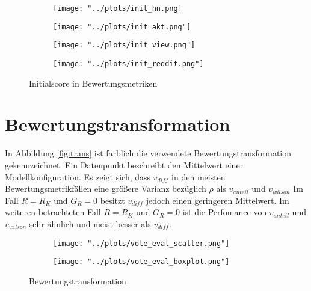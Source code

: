 \begin{figure}[!htb]
	\begin{subfigure}{0.5\textwidth}
		\texttt{[image: "../plots/init\_hn.png]}%
	\end{subfigure}
	\hfill
	\begin{subfigure}{0.5\textwidth}
		
		
		\texttt{[image: "../plots/init\_akt.png"]}%

	\end{subfigure}
	\begin{subfigure}{0.5\textwidth}
		\texttt{[image: "../plots/init\_view.png"]}%
	\end{subfigure}
	\hfill
	\begin{subfigure}{0.5\textwidth}
		\texttt{[image: "../plots/init\_reddit.png"]}%
	\end{subfigure}
	\caption{Initialscore in Bewertungsmetriken}
	\label{fig:init_scoring_functions}
\end{figure}



\section{Bewertungstransformation}

In Abbildung \ref{fig:trans} ist farblich die verwendete Bewertungstransformation gekennzeichnet. Ein Datenpunkt beschreibt den Mittelwert einer Modellkonfiguration. Es zeigt sich, dass $v_{diff}$ in den meisten Bewertungsmetrikfällen eine größere Varianz bezüglich $\rho$ als $v_{anteil}$ und $v_{wilson}$ Im Fall $R = R_K$ und $G_R = 0$ besitzt $v_{diff}$ jedoch einen geringeren Mittelwert. Im weiteren betrachteten Fall $R = R_K$ und $G_R = 0$ ist die Perfomance von $v_{anteil}$ und $v_{wilson}$ sehr ähnlich und meist besser als $v_{diff}$.  

\begin{figure}[!h]
	\label{fig:trans}	
	\begin{subfigure}{0.5\textwidth}
		\texttt{[image: "../plots/vote\_eval\_scatter.png"]}
	\end{subfigure}
	\begin{subfigure}{0.5\textwidth}
		\texttt{[image: "../plots/vote\_eval\_boxplot.png"]}
	\end{subfigure}
	\caption{Bewertungstransformation}
\end{figure}



